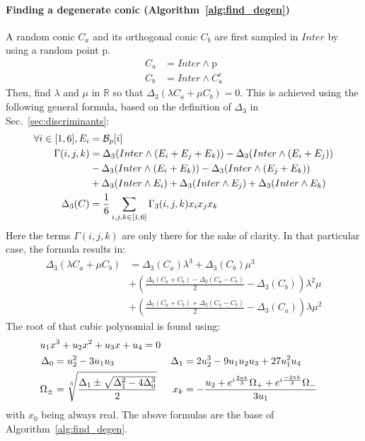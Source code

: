 \documentclass{birkjour}
\begin{document}
\paragraph{\textbf{Finding a degenerate conic (Algorithm~\ref{alg:find_degen})}}
A random conic \(C_a\) and its orthogonal conic \(C_b\) are first sampled in \(Inter\) by using a random point \(\mathrm{p}\).
\begin{align}
C_a &= Inter \wedge \mathrm{p} \\
C_b &= Inter \wedge C_a^c
\end{align}
Then, find \(\lambda\) and \(\mu\) in \(\mathbb{R}\) so that \(\Delta_3(\lambda C_a + \mu C_b) = 0\). This is achieved using the following general formula, based on the definition of \(\Delta_3\) in Sec.~\ref{sec:discriminants}:
\begin{align}
\forall i \in [1,6], E_i &= \mathcal{B}_{p}[i]\\
\Gamma(i,j,k) &= \Delta_3(Inter\wedge(E_i + E_j + E_k)) - \Delta_3(Inter\wedge(E_i + E_j)) \notag\\ &- \Delta_3(Inter\wedge(E_i + E_k)) - \Delta_3(Inter\wedge(E_j + E_k)) \notag\\
&+ \Delta_3(Inter\wedge E_i) + \Delta_3(Inter\wedge E_j) + \Delta_3(Inter\wedge E_k)  \\
\Delta_3(C) &= \frac{1}{6} \sum_{i,j,k\in[1,6]} \Gamma_3(i,j,k) x_i x_j x_k
\end{align}
Here the terms \(\Gamma(i,j,k)\) are only there for the sake of clarity.
In that particular case, the formula results in:
\begin{align}
    \Delta_3(\lambda C_a + \mu C_b) &= \Delta_3(C_a)\lambda^3 + \Delta_3(C_b)\mu^3 \\
    &+ \left(\frac{\Delta_3(C_a+C_b) - \Delta_3(C_a - C_b)}{2}-\Delta_3(C_b)\right) \lambda^2\mu \\&+ \left(\frac{\Delta_3(C_a+C_b)  + \Delta_3(C_a - C_b)}{2}-\Delta_3(C_a)\right) \lambda\mu^2 
\end{align}
The root of that cubic polynomial is found using:
\begin{align}
\span u_1x^3+u_2x^2+u_3x+u_4=0\\
\Delta_0 &= u_2^2 - 3u_1u_3 &
\Delta_1 &= 2u_2^3 - 9u_1u_2u_3 + 27u_1^2u_4 \\
\Omega_{\pm} &= \sqrt[3]{\frac{\Delta_1 \pm \sqrt{\Delta_1^2 - 4\Delta_0^3}}{2}}
&x_k &= -\frac{u_2 + e^{i\frac{2\pi k}{3}}\Omega_{+} + e^{i\frac{-2\pi k}{3}}\Omega_{-}}{3u_1} &
\end{align}
with \(x_0\) being always real.
The above formulas are the base of Algorithm~\ref{alg:find_degen}.
\end{document}

